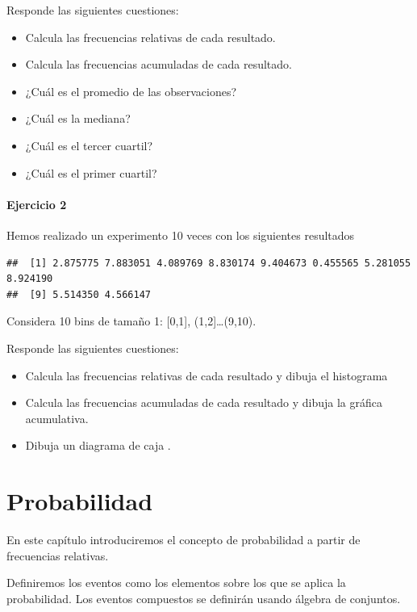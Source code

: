\documentclass[
]{book}
\providecommand{\tightlist}{%
  \setlength{\itemsep}{0pt}\setlength{\parskip}{0pt}}
\begin{document}
Responde las siguientes cuestiones:

\begin{itemize}
\tightlist
\item
  Calcula las frecuencias relativas de cada resultado.
\item
  Calcula las frecuencias acumuladas de cada resultado.
\item
  ¿Cuál es el promedio de las observaciones?
\item
  ¿Cuál es la mediana?
\item
  ¿Cuál es el tercer cuartil?
\item
  ¿Cuál es el primer cuartil?
\end{itemize}

\hypertarget{ejercicio-2}{%
\subsubsection{Ejercicio 2}\label{ejercicio-2}}

Hemos realizado un experimento 10 veces con los siguientes resultados

\begin{verbatim}
##  [1] 2.875775 7.883051 4.089769 8.830174 9.404673 0.455565 5.281055 8.924190
##  [9] 5.514350 4.566147
\end{verbatim}

Considera 10 bins de tamaño 1: {[}0,1{]}, (1,2{]}\ldots(9,10).

Responde las siguientes cuestiones:

\begin{itemize}
\item
  Calcula las frecuencias relativas de cada resultado y dibuja el histograma
\item
  Calcula las frecuencias acumuladas de cada resultado y dibuja la gráfica acumulativa.
\item
  Dibuja un diagrama de caja .
\end{itemize}

\hypertarget{probabilidad}{%
\chapter{Probabilidad}\label{probabilidad}}

En este capítulo introduciremos el concepto de probabilidad a partir de frecuencias relativas.

Definiremos los eventos como los elementos sobre los que se aplica la probabilidad. Los eventos compuestos se definirán usando álgebra de conjuntos.
\end{document}
